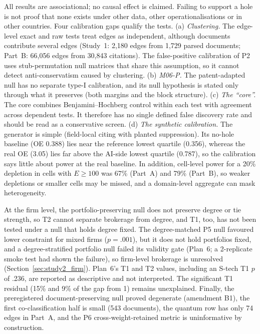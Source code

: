 All results are associational; no causal effect is claimed. Failing to support a hole is not proof that none exists under other data, other operationalisations or in other countries. Four calibration gaps qualify the tests.
(a) \emph{Clustering.} The edge-level exact and raw tests treat edges as independent, although documents contribute several edges (Study~1: 2,180 edges from 1,729 parsed documents; Part~B: 66,056 edges from 30,843 citations). The false-positive calibration of P2 uses stub-permutation null matrices that share this assumption, so it cannot detect anti-conservatism caused by clustering.
(b) \emph{M06-P.} The patent-adapted null has no separate type-I calibration, and its null hypothesis is stated only through what it preserves (both margins and the block structure).
(c) \emph{The ``core''.} The core combines Benjamini--Hochberg control within each test \citep{benjamini1995controlling} with agreement across dependent tests. It therefore has no single defined false discovery rate and should be read as a conservative screen.
(d) \emph{The synthetic calibration.} The generator is simple (field-local citing with planted suppression). Its no-hole baseline (OE 0.388) lies near the reference lowest quartile (0.356), whereas the real OE (3.05) lies far above the AI-side lowest quartile (0.787), so the calibration says little about power at the real baseline.
In addition, cell-level power for a 20\% depletion in cells with $E\geq100$ was 67\% (Part~A) and 79\% (Part~B), so weaker depletions or smaller cells may be missed, and a domain-level aggregate can mask heterogeneity.

At the firm level, the portfolio-preserving null does not preserve degree or tie strength, so T2 cannot separate brokerage from degree, and T1, too, has not been tested under a null that holds degree fixed. The degree-matched P5 null favoured lower constraint for mixed firms ($p=.001$), but it does not hold portfolios fixed, and a degree-stratified portfolio null failed its validity gate (Plan~6; a 2-replicate smoke test had shown the failure), so firm-level brokerage is unresolved (Section~\ref{sec:study2_firm}). Plan~6's T1 and T2 values, including an S-tech T1 $p$ of .236, are reported as descriptive and not interpreted. The significant T1 residual (15\% and 9\% of the gap from 1) remains unexplained. Finally, the preregistered document-preserving null proved degenerate (amendment B1), the first co-classification half is small (543 documents), the quantum row has only 74 edges in Part~A, and the P6 cross-weight-retained metric is uninformative by construction.

